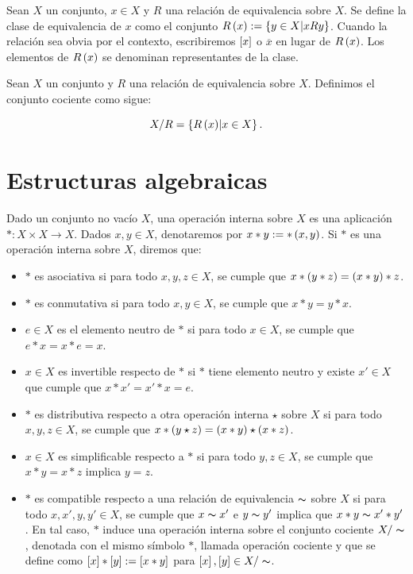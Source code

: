 \begin{definition}
\rm Sean $X$ un conjunto, $x\in X$ y $R$ una relación de equivalencia sobre $X$. Se define la clase de equivalencia de $x$ como el conjunto $R\left(x\right):=\left\{y\in X\middle|xRy\right\}$. Cuando la relación sea obvia por el contexto, escribiremos $\left[x\right]$ o $\overline{x}$ en lugar de $R\left(x\right)$. Los elementos de $R\left(x\right)$ se denominan representantes de la clase.
\end{definition}

\begin{definition}
\rm Sean $X$ un conjunto y $R$ una relación de equivalencia sobre $X$. Definimos el conjunto cociente como sigue:

\begin{equation}
    X/R=\left\{R\left(x\right)\middle|x\in X\right\}.
\end{equation}

\end{definition}

\section{Estructuras algebraicas}

\begin{definition}
\rm Dado un conjunto no vacío $X$, una operación interna sobre $X$ es una aplicación $\ast: X\times X\rightarrow X$. Dados $x,y\in X$, denotaremos por $x\ast y:=\ast\left(x,y\right)$. Si $\ast$ es una operación interna sobre $X$, diremos que:

\begin{itemize}
  \item $\ast$ es asociativa si para todo $x,y,z\in X$, se cumple que $x\ast\left(y\ast z\right)=\left(x\ast y\right)\ast z$.
  \item $\ast$ es conmutativa si para todo $x,y\in X$, se cumple que $x\ast y=y\ast x$.
  \item $e\in X$ es el elemento neutro de $\ast$ si para todo $x\in X$, se cumple que $e\ast x=x\ast e=x$. 
  \item $x\in X$ es invertible respecto de $\ast$ si $\ast$ tiene elemento neutro y existe $x'\in X$ que cumple que $x\ast x'=x'\ast x=e$.
  \item $\ast$ es distributiva respecto a otra operación interna $\star$ sobre $X$ si para todo $x,y,z\in X$, se cumple que $x\ast\left(y\star z\right)=\left(x\ast y\right)\star\left(x\ast z\right)$.
  \item $x\in X$ es simplificable respecto a $\ast$ si para todo $y,z\in X$, se cumple que $x\ast y=x\ast z$ implica $y=z$.
  \item $\ast$ es compatible respecto a una relación de equivalencia $\thicksim$ sobre $X$ si para todo $x,x',y,y'\in X$, se cumple que $x\thicksim x'$ e $y\thicksim y'$ implica que $x\ast y\thicksim x'\ast y'$. En tal caso, $\ast$ induce una operación interna sobre el conjunto cociente $X/\thicksim$, denotada con el mismo símbolo $\ast$, llamada operación cociente y que se define como $\left[x\right]\ast\left[y\right]:=\left[x\ast y\right]$ para $\left[x\right],\left[y\right]\in X/\thicksim$.
\end{itemize}
\end{definition}


